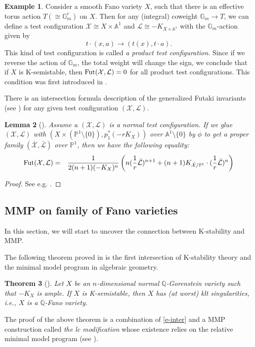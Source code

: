 \documentclass[12pt,reqno]{amsart}%
\newcommand{\cX}{{\mathcal{X}}}
\newcommand{\cL}{{\mathcal{L}}}
\newtheorem{thm}{Theorem}[section]
\newtheorem{lem}[thm]{Lemma}
\theoremstyle{definition}
\newtheorem{exmp}[thm]{Example}
\theoremstyle{remark}
\newcommand{\Fut}{{\rm Fut}}
\newcommand{\bQ}{{\mathbb{Q}}}
\begin{document}
\begin{exmp}Consider a smooth Fano variety $X$, such that there is an effective torus action $T(\cong \mathbb{G}_m^r)$ on $X$. Then for any (integral) coweight $\mathbb{G}_m\to T$, we can define a  test configuration $ \mathcal{X}\cong X\times \mathbb{A}^1$ and $\mathcal{L}\cong  -K_{X\times \mathbb{A}^1} $ with the $\mathbb{G}_m$-action given by 
\[
t\cdot (x,a)\to (t(x), t\cdot a).
\]
This kind of test configuration is called {\it a product test configuration}. Since if we reverse the action of $\mathbb{G}_m$, the total weight will change the sign, we conclude that if $X$ is K-semistable, then ${\rm Fut}( \mathcal{X},\mathcal{L})=0$ for all product test configurations. This condition was first introduced in \cite{Fut83}. 
\end{exmp}

There is an intersection formula description of the generalized Futaki invariants (see \cite{Wan12, Oda13b}) for any given test configuration $(\cX, \cL)$.
\begin{lem}[{\cite{Wan12, Oda13b}}]\label{l-intersection} 
Assume a $(\cX,\cL)$ is a normal test configuration. If we glue $(\cX, \cL)$ with $(X
\times (\mathbb{P}^1\setminus \{0\}) ,p_1^*(-rK_{X}))$ over $\mathbb{A}^1\setminus \{0\}$ by $\phi$ to get a proper family $(\bar{\cX}, \bar{\cL})$ over $\mathbb{P}^1$,
then we have the following equality:
\begin{eqnarray}\label{e-inter}
 \Fut(\cX,{\cL})&= &\frac{1}{2(n+1)(-K_X)^n}\left(n (\frac{1}{r}\bar{\cL})^{n+1}+(n+1)K_{\bar{\cX}/\mathbb{P}^1}\cdot(\frac{1}{r}\bar{\cL})^{n}\right)
\end{eqnarray}
\end{lem}
\begin{proof}See e.g. \cite[Page 224-225]{LX14}.
\end{proof}


\subsection{MMP on family of Fano varieties}\label{ss-mmp}
In this section, we will start to uncover the connection between K-stability and MMP. 

The following theorem proved in \cite{Oda13} is the first intersection of K-stability theory and the minimal model program in algebraic geometry.
\begin{thm}[{\cite{Oda13}}]Let $X$ be an $n$-dimensional normal $\mathbb{Q}$-Gorenstein variety such that $-K_X$ is ample. If $X$ is K-semistable, then $X$ has (at worst) klt singularities, i.e., $X$ is a $\bQ$-Fano variety.
\end{thm}
The proof of the above theorem is a combination of \eqref{e-inter} and a MMP construction called {\it the lc modification} whose existence relies on the relative minimal model program (see \cite{OX12}).
\end{document}
